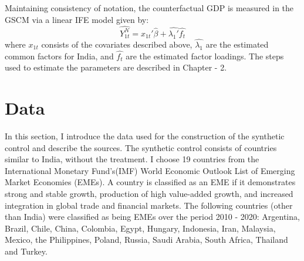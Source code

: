 \documentclass[12pt,nobind, a4paper]{reedthesis}
\begin{document}
 Maintaining consistency of notation, the counterfactual GDP is measured in the GSCM via a linear IFE model given by:
 \begin{equation}
 \hat{Y_{1t}^{N}}=x_{1t}'\hat{\beta}+\hat{\lambda_{1}'}\hat{f_{t}}
 \label{eq:eq009}
 \end{equation}
 where \(x_{1t}\) consists of the covariates described above, \(\hat{\lambda_{1}}\) are the estimated common factors for India, and \(\hat{f_{t}}\) are the estimated factor loadings. The steps used to estimate the parameters are described in Chapter - 2.

 \hypertarget{data}{%
 \section{Data}\label{data}}

 In this section, I introduce the data used for the construction of the synthetic control and describe the sources. The synthetic control consists of countries similar to India, without the treatment. I choose 19 countries from the International Monetary Fund's(IMF) World Economic Outlook List of Emerging Market Economies (EMEs). A country is classified as an EME if it demonstrates strong and stable growth, production of high value-added growth, and increased integration in global trade and financial markets. The following countries (other than India) were classified as being EMEs over the period 2010 - 2020: Argentina, Brazil, Chile, China, Colombia, Egypt, Hungary, Indonesia, Iran, Malaysia, Mexico, the Philippines, Poland, Russia, Saudi Arabia, South Africa, Thailand and Turkey.
 \linebreak
\end{document}
